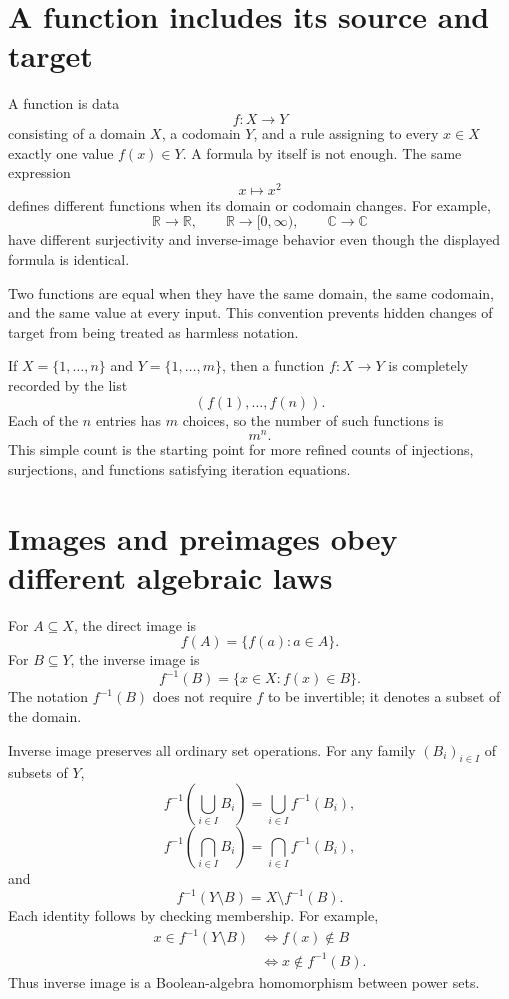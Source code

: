 
\section{A function includes its source and target}

A function is data
\[
  f:X\to Y
\]
consisting of a domain \(X\), a codomain \(Y\), and a rule assigning to every \(x\in X\) exactly one value \(f(x)\in Y\).  A formula by itself is not enough.  The same expression
\[
  x\longmapsto x^2
\]
defines different functions when its domain or codomain changes.  For example,
\[
  \mathbb R\to\mathbb R,
  \qquad
  \mathbb R\to[0,\infty),
  \qquad
  \mathbb C\to\mathbb C
\]
have different surjectivity and inverse-image behavior even though the displayed formula is identical.

Two functions are equal when they have the same domain, the same codomain, and the same value at every input.  This convention prevents hidden changes of target from being treated as harmless notation.

If \(X=\{1,\ldots,n\}\) and \(Y=\{1,\ldots,m\}\), then a function \(f:X\to Y\) is completely recorded by the list
\[
  (f(1),\ldots,f(n)).
\]
Each of the \(n\) entries has \(m\) choices, so the number of such functions is
\[
  m^n.
\]
This simple count is the starting point for more refined counts of injections, surjections, and functions satisfying iteration equations.

\section{Images and preimages obey different algebraic laws}

For \(A\subseteq X\), the direct image is
\[
  f(A)=\{f(a):a\in A\}.
\]
For \(B\subseteq Y\), the inverse image is
\[
  f^{-1}(B)=\{x\in X:f(x)\in B\}.
\]
The notation \(f^{-1}(B)\) does not require \(f\) to be invertible; it denotes a subset of the domain.

Inverse image preserves all ordinary set operations.  For any family \((B_i)_{i\in I}\) of subsets of \(Y\),
\[
  f^{-1}\left(\bigcup_{i\in I}B_i\right)
  =\bigcup_{i\in I}f^{-1}(B_i),
\]
\[
  f^{-1}\left(\bigcap_{i\in I}B_i\right)
  =\bigcap_{i\in I}f^{-1}(B_i),
\]
and
\[
  f^{-1}(Y\setminus B)=X\setminus f^{-1}(B).
\]
Each identity follows by checking membership.  For example,
\[
\begin{aligned}
x\in f^{-1}(Y\setminus B)
&\Longleftrightarrow f(x)\notin B\\
&\Longleftrightarrow x\notin f^{-1}(B).
\end{aligned}
\]
Thus inverse image is a Boolean-algebra homomorphism between power sets.

